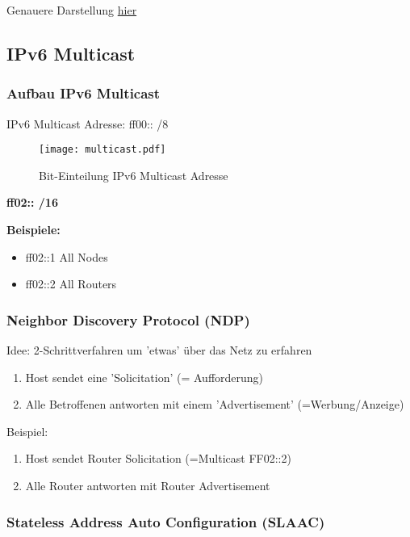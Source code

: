 \documentclass[asp1.tex]{subfiles}
\begin{document}
Genauere Darstellung \href{https://www.internex.at/de/toolbox/ipv6/ip6=fd00:1:2::/prefix=52/subnetNo=16}{hier}

\subsection{IPv6 Multicast}

\subsubsection{Aufbau IPv6 Multicast}

IPv6 Multicast Adresse: ff00:: /8



\begin{figure}[H]
	\texttt{[image: multicast.pdf]}
	\caption{Bit-Einteilung IPv6 Multicast Adresse}
\end{figure}

\textrightarrow\space \textbf{ff02:: /16}

\textbf{Beispiele:}
\begin{itemize}
    \item ff02::1 \textrightarrow\space All Nodes
    \item ff02::2 \textrightarrow\space All Routers
\end{itemize}


\subsubsection{Neighbor Discovery Protocol (NDP)}

Idee: 2-Schrittverfahren um 'etwas' über das Netz zu erfahren
\begin{enumerate}
    \item Host sendet eine 'Solicitation' (= Aufforderung)
    \item Alle Betroffenen antworten mit einem 'Advertisement' (=Werbung/Anzeige)
\end{enumerate}

Beispiel:
\begin{enumerate}
    \item Host sendet Router Solicitation (=Multicast FF02::2)
    \item Alle Router antworten mit Router Advertisement
\end{enumerate}

\subsubsection{Stateless Address Auto Configuration (SLAAC)}
\end{document}

